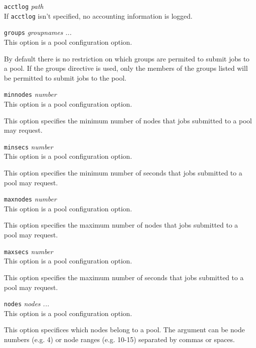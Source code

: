 \documentclass[oneside]{book}
\begin{document}
\begin{description}

\item{\texttt{acctlog} \emph{path}}\\
If \texttt{acctlog} isn't specified, no accounting information is
logged.

\item{\texttt{groups} \emph{groupnames ...}}\\
This option is a pool configuration option.

By default there is no restriction on which groups are permited to
submit jobs to a pool.  If the groups directive is used, only the
members of the groups listed will be permitted to submit jobs to the
pool.

\item{\texttt{minnodes} \emph{number}}\\
This option is a pool configuration option.

This option specifies the minimum number of nodes that jobs submitted
to a pool may request.

\item{\texttt{minsecs} \emph{number}}\\
This option is a pool configuration option.

This option specifies the minimum number of seconds that jobs submitted
to a pool may request.

\item{\texttt{maxnodes} \emph{number}}\\
This option is a pool configuration option.

This option specifies the maximum number of nodes that jobs submitted
to a pool may request.

\item{\texttt{maxsecs} \emph{number}}\\
This option is a pool configuration option.

This option specifies the maximum number of seconds that jobs submitted
to a pool may request.

\item{\texttt{nodes} \emph{nodes ...}}\\
This option is a pool configuration option.

This option specifices which nodes belong to a pool.  The argument can
be node numbers (e.g. 4) or node ranges (e.g. 10-15) separated by
commas or spaces.


\end{description}
\end{document}

